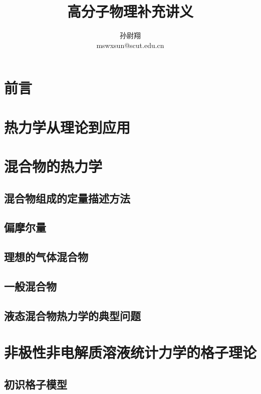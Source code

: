 \documentclass[
  zihao=5,
  linespread=1.3,
  a4paper,
  heading=true,
  twoside
]{ctexbook}
\title{高分子物理补充讲义}
\author{孙尉翔\\mswxsun@scut.edu.cn}
\theoremstyle{definition}
\theoremstyle{plain}
\begin{document}
\maketitle
\frontmatter
\pagestyle{fancy}
\chapter*{前言}\label{sec:preface}


\tableofcontents
\mainmatter
\chapter{热力学从理论到应用}\label{sec:I_thermodynamic_relations}


\chapter{混合物的热力学}\label{sec:II 混合物的热力学}
\section{混合物组成的定量描述方法}\label{sec:II.1 composition_measures}

\section{偏摩尔量}\label{sec:II.2 partial_molar_quantities}

\section{理想的气体混合物}\label{sec:II.3 ideal_mixture.tex}

\section{一般混合物}\label{sec:II.4 real_mixture}

\section{液态混合物热力学的典型问题}\label{sec:II.5 typical_problems}


\chapter{非极性非电解质溶液统计力学的格子理论}

\section{初识格子模型}

\end{document}
